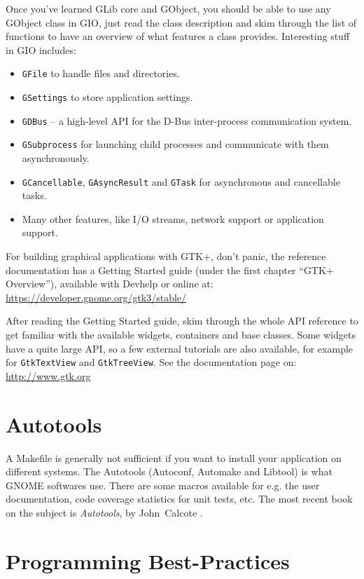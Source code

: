 Once you've learned GLib core and GObject, you should be able to use any GObject class in GIO, just read the class description and skim through the list of functions to have an overview of what features a class provides. Interesting stuff in GIO includes:
\begin{itemize}
  \item \lstinline{GFile} to handle files and directories.
  \item \lstinline{GSettings} to store application settings.
  \item \lstinline{GDBus} -- a high-level API for the D-Bus inter-process communication system.
  \item \lstinline{GSubprocess} for launching child processes and communicate with them asynchronously.
  \item \lstinline{GCancellable}, \lstinline{GAsyncResult} and \lstinline{GTask} for asynchronous and cancellable tasks.
  \item Many other features, like I/O streams, network support or application support.
\end{itemize}

For building graphical applications with GTK+, don't panic, the reference documentation has a Getting Started guide (under the first chapter ``GTK+ Overview''), available with Devhelp or online at:\\
\url{https://developer.gnome.org/gtk3/stable/}

After reading the Getting Started guide, skim through the whole API reference to get familiar with the available widgets, containers and base classes. Some widgets have a quite large API, so a few external tutorials are also available, for example for \lstinline{GtkTextView} and \lstinline{GtkTreeView}. See the documentation page on:\\
\url{http://www.gtk.org}

\section{Autotools}

A Makefile is generally not sufficient if you want to install your application on different systems. The Autotools (Autoconf, Automake and Libtool) is what GNOME softwares use. There are some macros available for e.g. the user documentation, code coverage statistics for unit tests, etc. The most recent book on the subject is \emph{Autotools}, by John~Calcote \cite{autotools}.

\section{Programming Best-Practices}

